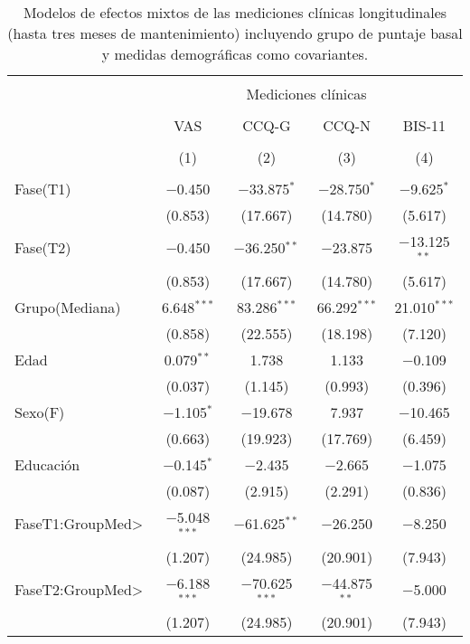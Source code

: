 \begin{table}[!htbp] \centering
    \small
    \caption{Modelos de efectos mixtos de las mediciones clínicas longitudinales (hasta tres meses de mantenimiento) incluyendo grupo de puntaje basal y medidas demográficas como covariantes.}
  \label{tab:clin2}
\begin{tabular}{@{\extracolsep{5pt}}lcccc}
\\[-1.8ex]\hline
\hline \\[-1.8ex]
 & \multicolumn{4}{c}{Mediciones clínicas } \\
\cline{2-5}
\\[-1.8ex] & VAS & CCQ-G & CCQ-N & BIS-11\\
\\[-1.8ex] & (1) & (2) & (3) & (4) \\
\hline \\[-1.8ex]
 Fase(T1) & $-$0.450 & $-$33.875$^{*}$ & $-$28.750$^{*}$ & $-$9.625$^{*}$ \\
  & (0.853) & (17.667) & (14.780) & (5.617) \\
  Fase(T2) & $-$0.450 & $-$36.250$^{**}$ & $-$23.875 & $-$13.125$^{**}$ \\
  & (0.853) & (17.667) & (14.780) & (5.617) \\
  Grupo(Mediana) & 6.648$^{***}$ & 83.286$^{***}$ & 66.292$^{***}$ & 21.010$^{***}$ \\
  & (0.858) &  (22.555) &(18.198) & (7.120) \\
  Edad & 0.079$^{**}$ & 1.738 & 1.133 & $-$0.109 \\
  & (0.037) & (1.145) & (0.993) & (0.396) \\
  Sexo(F) & $-$1.105$^{*}$ & $-$19.678 & 7.937 & $-$10.465 \\
  & (0.663) & (19.923) & (17.769) & (6.459) \\
  Educación & $-$0.145$^{*}$ & $-$2.435 & $-$2.665 & $-$1.075 \\
  & (0.087) & (2.915) & (2.291) & (0.836) \\
  FaseT1:GroupMed\textgreater  & $-$5.048$^{***}$ &  $-$61.625$^{**}$  & $-$26.250  & $-$8.250 \\
  & (1.207) & (24.985) & (20.901) & (7.943) \\
  FaseT2:GroupMed\textgreater  & $-$6.188$^{***}$ & $-$70.625$^{***}$  & $-$44.875$^{**}$  & $-$5.000 \\
  & (1.207) & (24.985) & (20.901) & (7.943) \\

\end{tabular}
\end{table}
